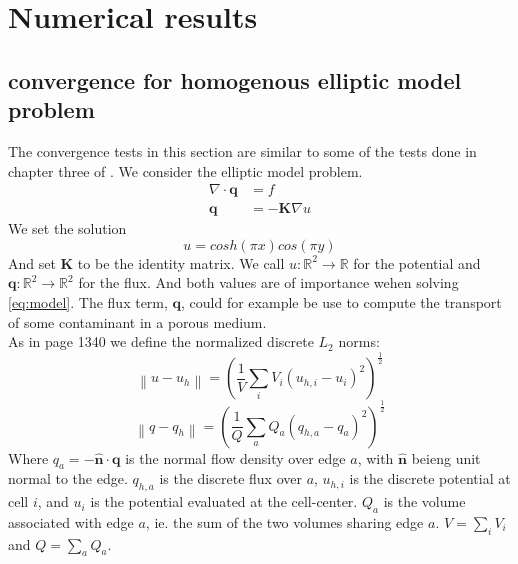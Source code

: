 \documentclass[../Main/main.tex]{subfiles}
\begin{document}
\graphicspath{{../numerical results/figs/}}
		\chapter{Numerical results}
		\section*{convergence for homogenous elliptic model problem}
		The convergence tests in this section are similar to some of the tests done in chapter three of \cite{https://doi.org/10.1002/num.20320}. We consider the elliptic model problem.
		\begin{equation} \label{eq:model}
			\begin{split}
				\nabla \cdot \pmb{q} &= f \\
				\pmb{q} &= -\pmb{K}\nabla u
			\end{split}
		\end{equation}
		We set the solution
		\begin{equation}\label{eq:pressure_solution_model}
			u = cosh(\pi x)cos(\pi y)
		\end{equation} 
		And set $\pmb{K}$ to be the identity matrix. We call $u: \mathbb{R}^2 \rightarrow \mathbb{R}$ for the potential and $\pmb{q}:\mathbb{R}^2 \rightarrow \mathbb{R}^2$ for the flux. And both values are of importance wehen solving \eqref{eq:model}. The flux term, $\pmb{q}$, could for example be use to compute the transport of some contaminant in a porous medium.\\
		As in \cite{https://doi.org/10.1002/num.20320} page 1340 we define the normalized discrete $L_2$ norms:
		\begin{equation}
			\left \| u - u_h \right \| =  \left (  \frac{1}{V}\sum_i V_i(u_{h,i}-u_i)^2\right )^{\frac{1}{2}}
		\end{equation}
		\begin{equation}\label{eq:normal_flow_density}
			\left \| q - q_h \right \| =  \left (  \frac{1}{Q}\sum_a Q_a(q_{h,a}-q_a)^2\right )^{\frac{1}{2}}
		\end{equation}
		Where $q_a = -\pmb{\hat{n}} \cdot \pmb{q}$ is the normal flow density over edge $a$, with $\pmb{\hat{n}}$ beieng unit normal to the edge. $q_{h,a}$ is the discrete flux over $a$, $u_{h,i}$ is the discrete potential at cell $i$, and $u_i$ is the potential evaluated at the cell-center. $Q_a$ is the volume associated with edge $a$, ie. the sum of the two volumes sharing edge $a$. $V = \sum_{i} V_i$ and $Q = \sum_{a} Q_a$.
		\par 
\end{document}
